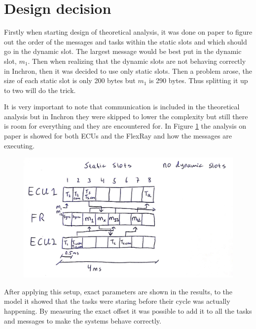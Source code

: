 \section{Design decision}

Firstly when starting design of theoretical analysis, it was done on paper to figure out the order of the messages and tasks within the static slots and which should go in the dynamic slot. The largest message would be best put in the dynamic slot, $m_1$. Then when realizing that the dynamic slots are not behaving correctly in Inchron, then it was decided to use only static slots. Then a problem arose, the size of each static slot is only 200 bytes but $m_1$ is 290 bytes. Thus splitting it up to two will do the trick.

It is very important to note that communication is included in the theoretical analysis but in Inchron they were skipped to lower the complexity but still there is room for everything and they are encountered for. In Figure \ref{fig:FRdrawing} the analysis on paper is showed for both ECUs and the FlexRay and how the messages are executing.
\begin{figure}[h!]
	\begin{center}
		\includegraphics[width=0.9\linewidth]{img/FR-drawing-2}
		\caption{}
		\label{fig:FRdrawing}
	\end{center}
\end{figure}

After applying this setup, exact parameters are shown in the results, to the model it showed that the tasks were staring before their cycle was actually happening. By measuring the exact offset it was possible to add it to all the tasks and messages to make the systems behave correctly. 

